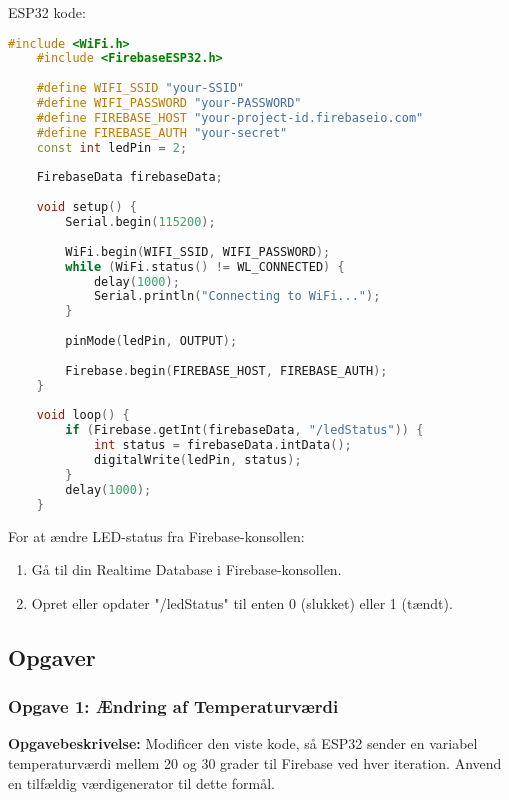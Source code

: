ESP32 kode:
\begin{lstlisting}[language=C++, caption=ESP32 kode til modtagelse af LED status fra Firebase RTDB]
	#include <WiFi.h>
	#include <FirebaseESP32.h>
	
	#define WIFI_SSID "your-SSID"
	#define WIFI_PASSWORD "your-PASSWORD"
	#define FIREBASE_HOST "your-project-id.firebaseio.com"
	#define FIREBASE_AUTH "your-secret"
	const int ledPin = 2;
	
	FirebaseData firebaseData;
	
	void setup() {
		Serial.begin(115200);
		
		WiFi.begin(WIFI_SSID, WIFI_PASSWORD);
		while (WiFi.status() != WL_CONNECTED) {
			delay(1000);
			Serial.println("Connecting to WiFi...");
		}
		
		pinMode(ledPin, OUTPUT);
		
		Firebase.begin(FIREBASE_HOST, FIREBASE_AUTH);
	}
	
	void loop() {
		if (Firebase.getInt(firebaseData, "/ledStatus")) {
			int status = firebaseData.intData();
			digitalWrite(ledPin, status);
		}
		delay(1000);
	}
\end{lstlisting}

For at ændre LED-status fra Firebase-konsollen:
\begin{enumerate}
	\item Gå til din Realtime Database i Firebase-konsollen.
	\item Opret eller opdater "/ledStatus" til enten 0 (slukket) eller 1 (tændt).
\end{enumerate}

\subsection*{Opgaver}

\subsubsection{Opgave 1: Ændring af Temperaturværdi}

\textbf{Opgavebeskrivelse:} Modificer den viste kode, så ESP32 sender en variabel temperaturværdi mellem 20 og 30 grader til Firebase ved hver iteration. Anvend en tilfældig værdigenerator til dette formål.

